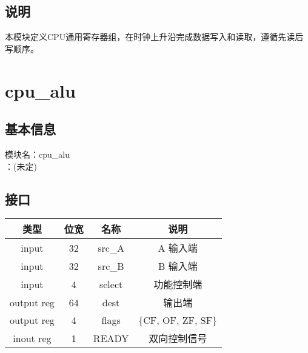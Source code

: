 \subsection{说明}
本模块定义CPU通用寄存器组，在时钟上升沿完成数据写入和读取，遵循先读后写顺序。

\section{cpu\_alu}
\subsection{基本信息}
模块名：cpu\_alu\\
：(未定)
\subsection{接口}
\begin{tabular}{|c|c|c|c|}
    \hline
    类型       &   位宽    &   名称    &   说明\\\hline
    input      &   32      &   src\_A   &   A 输入端\\\hline
    input      &   32      &   src\_B   &   B 输入端\\\hline
    input      &   4       &    select  &   功能控制端\\\hline
    output reg &   64      &    dest    &   输出端\\\hline
    output reg &   4       &    flags   &   \{CF, OF, ZF, SF\}\\\hline
    inout reg  &   1       &    READY   &   双向控制信号\\\hline
\end{tabular}
